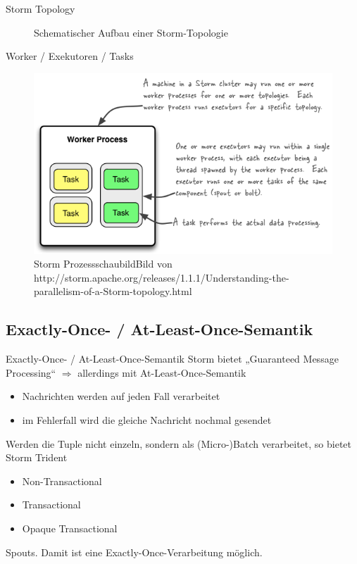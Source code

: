 \documentclass{beamer}
\begin{document}
\begin{frame}[t]{Storm Topology}
  \begin{figure}[h]
    \center
    \scalebox{.7}{}
    \caption{Schematischer Aufbau einer Storm-Topologie}
    \label{fig:topology}
  \end{figure}
\end{frame}

\begin{frame}[t]{Worker / Exekutoren / Tasks}
  \begin{figure}
    \centering
    \includegraphics[scale=0.8]{img/relationships-worker-processes-executors-tasks.png}
    \caption{Storm Prozessschaubild\hspace{\linewidth}Bild von http://storm.apache.org/releases/1.1.1/Understanding-the-parallelism-of-a-Storm-topology.html}
  \end{figure}
\end{frame}


\subsection{Exactly-Once- / At-Least-Once-Semantik}
\begin{frame}[t]{Exactly-Once- / At-Least-Once-Semantik}
  Storm bietet „Guaranteed Message Processing“ $\Rightarrow$ allerdings mit
  At-Least-Once-Semantik
  \begin{itemize}
    \item Nachrichten werden auf jeden Fall verarbeitet
    \item im Fehlerfall wird die gleiche Nachricht nochmal gesendet
  \end{itemize}
  \pause
  Werden die Tuple nicht einzeln, sondern als (Micro-)Batch verarbeitet, so bietet Storm Trident
  \begin{itemize}
    \item Non-Transactional
    \item Transactional
    \item Opaque Transactional
  \end{itemize}
  Spouts. Damit ist eine Exactly-Once-Verarbeitung möglich.
\end{frame}
\end{document}
